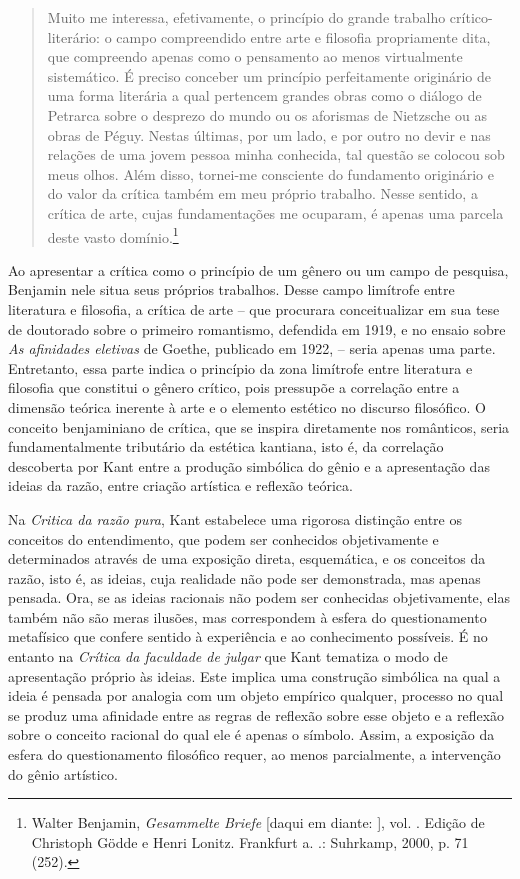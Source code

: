 \begin{quote}
Muito me interessa, efetivamente, o princípio do grande trabalho
crítico-literário: o campo compreendido entre arte e filosofia
propriamente dita, que compreendo apenas como o pensamento ao menos
virtualmente sistemático. É preciso conceber um princípio perfeitamente
originário de uma forma literária a qual pertencem grandes obras como o
diálogo de Petrarca sobre o desprezo do mundo ou os aforismas de
Nietzsche ou as obras de Péguy. Nestas últimas, por um lado, e por outro
no devir e nas relações de uma jovem pessoa minha conhecida, tal questão
se colocou sob meus olhos. Além disso, tornei-me consciente do
fundamento originário e do valor da crítica também em meu próprio
trabalho. Nesse sentido, a crítica de arte, cujas fundamentações me
ocuparam, é apenas uma parcela deste vasto domínio.\footnote{Walter
  Benjamin, \emph{Gesammelte Briefe} [daqui em diante: ], vol. .
  Edição de Christoph Gödde e Henri Lonitz. Frankfurt a. .: Suhrkamp,
  2000, p. 71 (252).}
\end{quote}

Ao apresentar a crítica como o princípio de um gênero ou um campo de
pesquisa, Benjamin nele situa seus próprios trabalhos. Desse campo
limítrofe entre literatura e filosofia, a crítica de arte -- que
procurara conceitualizar em sua tese de doutorado sobre o primeiro
romantismo, defendida em 1919, e no ensaio sobre \emph{As afinidades
eletivas} de Goethe, publicado em 1922, -- seria apenas uma parte.
Entretanto, essa parte indica o princípio da zona limítrofe entre
literatura e filosofia que constitui o gênero crítico, pois pressupõe a
correlação entre a dimensão teórica inerente à arte e o elemento
estético no discurso filosófico. O conceito benjaminiano de crítica, que
se inspira diretamente nos românticos, seria fundamentalmente tributário
da estética kantiana, isto é, da correlação descoberta por Kant entre a
produção simbólica do gênio e a apresentação das ideias da razão, entre
criação artística e reflexão teórica.

Na \emph{Critica da razão pura}, Kant estabelece uma rigorosa distinção
entre os conceitos do entendimento, que podem ser conhecidos
objetivamente e determinados através de uma exposição direta,
esquemática, e os conceitos da razão, isto é, as ideias, cuja realidade
não pode ser demonstrada, mas apenas pensada. Ora, se as ideias
racionais não podem ser conhecidas objetivamente, elas também não são
meras ilusões, mas correspondem à esfera do questionamento metafísico
que confere sentido à experiência e ao conhecimento possíveis. É no
entanto na \emph{Crítica da faculdade de julgar} que Kant tematiza o
modo de apresentação próprio às ideias. Este implica uma construção
simbólica na qual a ideia é pensada por analogia com um objeto empírico
qualquer, processo no qual se produz uma afinidade entre as regras de
reflexão sobre esse objeto e a reflexão sobre o conceito racional do
qual ele é apenas o símbolo. Assim, a exposição da esfera do
questionamento filosófico requer, ao menos parcialmente, a intervenção
do gênio artístico.

